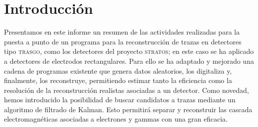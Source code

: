 \documentclass[a4paper]{article}
\let\vec\mathbf  %
\begin{document}

\section{Introducción}

Presentamos en este informe un resumen de las actividades realizadas para la puesta a punto de un programa para la reconstrucción de trazas en detectores tipo \textsc{trasgo}, como los detectores del proyecto \textsc{stratos}; en este caso se ha aplicado a detectores de electrodos rectangulares. Para ello se ha adaptado y mejorado una cadena de programas existente que genera datos aleatorios, los digitaliza y, finalmente, los reconstruye, permitiendo estimar tanto la eficiencia como la resolución de la reconstrucción realistas asociadas a un detector. Como novedad, hemos introducido la posibilidad de buscar candidatos a trazas mediante un algoritmo de filtrado de Kalman. Esto permitirá separar y reconstruir las cascada electromagnéticas asociadas a electrones y gammas con una gran eficacia.
\end{document}
